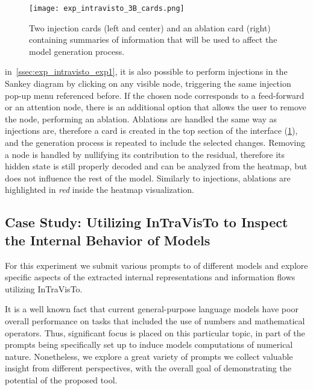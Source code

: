 \begin{figure}[t!]
    \centering
    \texttt{[image: exp\_intravisto\_3B\_cards.png]}
    \caption[Injection and ablation cards containing summaries of information that will be used to affect the model generation process.]{Two injection cards (left and center) and an ablation card (right) containing summaries of information that will be used to affect the model generation process.}
    \label{fig:exp_intravisto_3_B}
\end{figure}

 in~\cref{ssec:exp_intravisto_exp1}, it is also possible to perform injections in the Sankey diagram by clicking on any visible node, triggering the same injection pop-up menu referenced before.
If the chosen node corresponds to a feed-forward  or an attention node, there is an additional option that allows the user to remove the node, performing an ablation.
Ablations are handled the same way as injections are, therefore a card is created in the top section of the interface (\cref{fig:exp_intravisto_3_B}), and the generation process is repeated to include the selected changes.
Removing a node is handled by nullifying its contribution to the residual, therefore its hidden state is still properly decoded and can be analyzed from the heatmap, but does not influence the rest of the model.
Similarly to injections, ablations are highlighted in \emph{red} inside the heatmap visualization.

\subsection{Case Study: Utilizing InTraVisTo to Inspect the Internal Behavior of Models}\label{ssec:exp_intravisto_exp4}

For this experiment we submit various prompts to  of different models and explore specific aspects of the extracted internal representations and information flows utilizing InTraVisTo.

It is a well known fact that current general-purpose language models have  poor overall performance on tasks that included the use of numbers and mathematical operators.
Thus, significant focus is placed on this particular topic,  in part of the prompts being specifically set up to induce models  computations of numerical nature.
Nonetheless, we explore a great variety of prompts  we collect valuable insight from different perspectives, with the overall goal of demonstrating the potential of the proposed tool.

